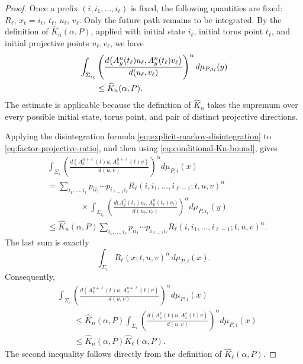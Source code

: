 \documentclass[11pt,a4paper]{amsart}
\begin{document}
\begin{proof}
Once a prefix \((i,i_1,\ldots,i_\ell)\) is fixed, the following
quantities are fixed:
 $R_\ell,\, x_\ell=i_\ell,\, t_\ell,\, u_\ell,\, v_\ell.$
Only the future path remains to be integrated.  By the definition of
\(\widehat K_n(\alpha,P)\), applied with initial state \(i_\ell\),
initial torus point \(t_\ell\), and initial projective points
\(u_\ell,v_\ell\), we have
\begin{align}
 &\int_{\Sigma_{i_\ell}}
 \left(
 \frac{
 d\bigl(A_y^n(t_\ell)u_\ell,
         A_y^n(t_\ell)v_\ell\bigr)}
 {d(u_\ell,v_\ell)}
 \right)^\alpha
 d\mu_{P,i_\ell}(y)
 \notag\\
 &\qquad\leq
 \widehat K_n(\alpha,P).
 \label{eq:conditional-Kn-bound}
\end{align}
The estimate is applicable because the definition of
\(\widehat K_n\) takes the supremum over every possible initial
state, torus point, and pair of distinct projective directions.

Applying the disintegration formula
\eqref{eq:explicit-markov-disintegration} to
\eqref{eq:factor-projective-ratio}, and then using
\eqref{eq:conditional-Kn-bound}, gives
\begin{align*}
 &\int_{\Sigma_i}
 \left(
 \frac{
 d(A_x^{n+\ell}(t)u,A_x^{n+\ell}(t)v)}
 {d(u,v)}
 \right)^\alpha
 d\mu_{P,i}(x)
 \\
 &=
 \sum_{i_1,\ldots,i_\ell}
 p_{ii_1}\cdots p_{i_{\ell-1}i_\ell}
 R_\ell(i,i_1,\ldots,i_{\ell-1};t,u,v)^\alpha
 \\
 &\qquad\qquad\times
 \int_{\Sigma_{i_\ell}}
 \left(
 \frac{
 d\bigl(A_y^n(t_\ell)u_\ell,
         A_y^n(t_\ell)v_\ell\bigr)}
 {d(u_\ell,v_\ell)}
 \right)^\alpha
 d\mu_{P,i_\ell}(y)
 \\
 &\leq
 \widehat K_n(\alpha,P)
 \sum_{i_1,\ldots,i_\ell}
 p_{ii_1}\cdots p_{i_{\ell-1}i_\ell}
 R_\ell(i,i_1,\ldots,i_{\ell-1};t,u,v)^\alpha.
\end{align*}
The last sum is exactly
\[
 \int_{\Sigma_i}
 R_\ell(x;t,u,v)^\alpha
 \,d\mu_{P,i}(x).
\]
Consequently,
\begin{align*}
 &\int_{\Sigma_i}
 \left(
 \frac{
 d(A_x^{n+\ell}(t)u,A_x^{n+\ell}(t)v)}
 {d(u,v)}
 \right)^\alpha
 d\mu_{P,i}(x)
 \\
 &\qquad\leq
 \widehat K_n(\alpha,P)
 \int_{\Sigma_i}
 \left(
 \frac{
 d(A_x^\ell(t)u,A_x^\ell(t)v)}
 {d(u,v)}
 \right)^\alpha
 d\mu_{P,i}(x)
 \\
 &\qquad\leq
 \widehat K_n(\alpha,P)
 \widehat K_\ell(\alpha,P).
\end{align*}
The second inequality follows directly from the definition of
\(\widehat K_\ell(\alpha,P)\).


\end{proof}
\end{document}
